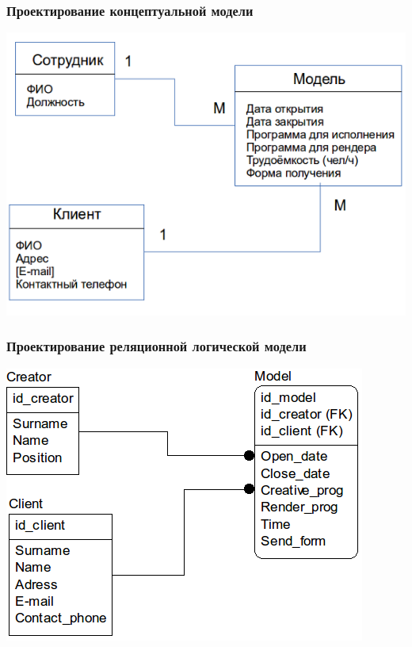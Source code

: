 \documentclass[a4paper, 12pt, titlepage]{article}
\begin{document}
\begin{otherlanguage}{russian}
\subsubsection{Проектирование концептуальной модели}
\includegraphics{concept1.png}
\subsubsection{Проектирование реляционной логической модели}
\begin{center}
\includegraphics{relational.png}
\end{center}

\newpage

\end{otherlanguage}
\end{document}

